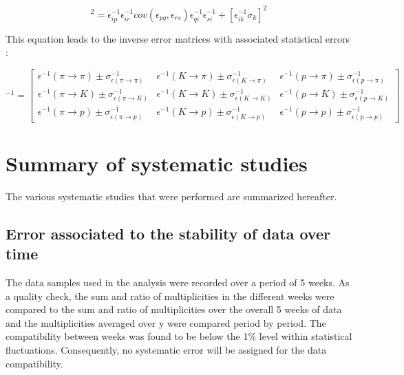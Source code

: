 \begin{equation}
  [\sigma^{-1}_i]^2 = \epsilon^{-1}_{ip}\epsilon^{-1}_{ir}cov(\epsilon_{pq},\epsilon_{rs})\epsilon^{-1}_{qi}\epsilon^{-1}_{si} + [\epsilon^{-1}_{ik}\sigma_k]^2
\end{equation}

This equation leads to the inverse error matrices with associated statistical errors :

\begin{equation}
[M^{\pm}_{RICH}]^{-1}
=
\begin{bmatrix}
\epsilon^{-1}(\pi \rightarrow \pi)\pm\sigma^{-1}_{\epsilon(\pi \rightarrow \pi)} & \epsilon^{-1}(K \rightarrow \pi)\pm\sigma^{-1}_{\epsilon(K \rightarrow \pi)} & \epsilon^{-1}(p \rightarrow \pi)\pm\sigma^{-1}_{\epsilon(p \rightarrow \pi)}\\
\epsilon^{-1}(\pi \rightarrow K)\pm\sigma^{-1}_{\epsilon(\pi \rightarrow K)} & \epsilon^{-1}(K \rightarrow K)\pm\sigma^{-1}_{\epsilon(K \rightarrow K)} & \epsilon^{-1}(p \rightarrow K)\pm\sigma^{-1}_{\epsilon(p \rightarrow K)} \\
\epsilon^{-1}(\pi \rightarrow p)\pm\sigma^{-1}_{\epsilon(\pi \rightarrow p)} & \epsilon^{-1}(K \rightarrow p)\pm\sigma^{-1}_{\epsilon(K \rightarrow p)} & \epsilon^{-1}(p \rightarrow p)\pm\sigma^{-1}_{\epsilon(p \rightarrow p)}
\end{bmatrix}
\end{equation}


\section{Summary of systematic studies}

The various systematic studies that were performed are summarized hereafter.


\subsection{Error associated to the stability of data over time}

The data samples used in the analysis were recorded over a period of 5 weeks. As a quality check, the sum and ratio of multiplicities in the different weeks were compared to the sum and ratio of multiplicities over the overall 5 weeks of data and the multiplicities averaged over y were compared period by period. The compatibility between weeks was found to be below the 1\% level within statistical fluctuations. Consequently, no systematic error will be assigned for the data compatibility.

